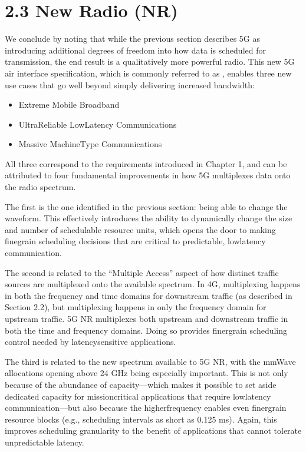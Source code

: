 \documentclass[a4paper,11pt,english]{sphinxmanual}
\begin{document}
\section{2.3 New Radio (NR)}
\label{\detokenize{primer:new-radio-nr}}
\sphinxAtStartPar
We conclude by noting that while the previous section describes 5G as
introducing additional degrees of freedom into how data is scheduled
for transmission, the end result is a qualitatively more powerful
radio. This new 5G air interface specification, which is commonly
referred to as , enables three new use cases that go
well beyond simply delivering increased bandwidth:
\begin{itemize}
\item {} 
\sphinxAtStartPar
Extreme Mobile Broadband

\item {} 
\sphinxAtStartPar
Ultra\sphinxhyphen{}Reliable Low\sphinxhyphen{}Latency Communications

\item {} 
\sphinxAtStartPar
Massive Machine\sphinxhyphen{}Type Communications

\end{itemize}

\sphinxAtStartPar
All three correspond to the requirements introduced in Chapter 1, and
can be attributed to four fundamental improvements in how 5G
multiplexes data onto the radio spectrum.

\sphinxAtStartPar
The first is the one identified in the previous section: being able to
change the waveform. This effectively introduces the ability to
dynamically change the size and number of schedulable resource units,
which opens the door to making fine\sphinxhyphen{}grain scheduling decisions that
are critical to predictable, low\sphinxhyphen{}latency communication.

\sphinxAtStartPar
The second is related to the “Multiple Access” aspect of how distinct
traffic sources are multiplexed onto the available spectrum. In 4G,
multiplexing happens in both the frequency and time domains for
downstream traffic (as described in Section 2.2), but multiplexing
happens in only the frequency domain for upstream traffic. 5G NR
multiplexes both upstream and downstream traffic in both the time and
frequency domains. Doing so provides finer\sphinxhyphen{}grain scheduling control
needed by latency\sphinxhyphen{}sensitive applications.

\sphinxAtStartPar
The third is related to the new spectrum available to 5G NR, with the
mmWave allocations opening above 24 GHz being especially
important. This is not only because of the abundance of capacity—which
makes it possible to set aside dedicated capacity for mission\sphinxhyphen{}critical
applications that require low\sphinxhyphen{}latency communication—but also because
the higher\sphinxhyphen{}frequency enables even finer\sphinxhyphen{}grain resource blocks (e.g.,
scheduling intervals as short as 0.125 ms). Again, this improves
scheduling granularity to the benefit of applications that cannot
tolerate unpredictable latency.
\end{document}
